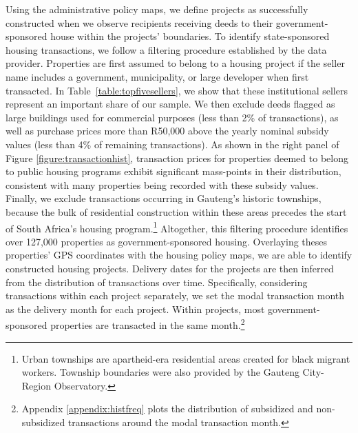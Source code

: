 \documentclass[12pt]{article}
\begin{document}
 Using the administrative policy maps, we define projects as successfully constructed when we observe recipients receiving deeds to their government-sponsored house within the projects' boundaries. To identify state-sponsored housing transactions, we follow a filtering procedure established by the data provider. Properties are first assumed to belong to a housing project if the seller name includes a government, municipality, or large developer when first transacted. In 	\mbox{Table \ref{table:topfivesellers}}, we show that these institutional sellers represent an important share of our sample. We then exclude deeds flagged as large buildings used for commercial purposes (less than 2\% of transactions), as well as purchase prices more than R50,000 above the yearly nominal subsidy values (less than 4\% of remaining transactions). As shown in the right panel of Figure \ref{figure:transactionhist}, transaction prices for properties deemed to belong to public housing programs exhibit significant mass-points in their distribution, consistent with many properties being recorded with these subsidy values. Finally, we exclude transactions occurring in Gauteng's historic townships, because the bulk of residential construction within these areas precedes the start of South Africa's housing program.\footnote{Urban townships are apartheid-era residential areas created for black migrant workers. Township boundaries were also provided by the Gauteng City-Region Observatory.} Altogether, this filtering procedure identifies over 127,000 properties as government-sponsored housing. Overlaying theses properties' GPS coordinates with the housing policy maps, we are able to identify constructed housing projects. Delivery dates for the projects are then inferred from the distribution of transactions over time. Specifically, considering transactions within each project separately, we set the modal transaction month as the delivery month for each project. Within projects, most government-sponsored properties are transacted in the same month.\footnote{Appendix \ref{appendix:histfreq} plots the distribution of subsidized and non-subsidized transactions around the modal transaction month.} %
\end{document}
